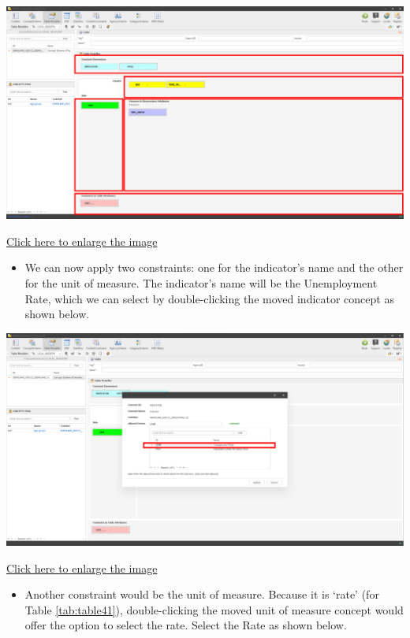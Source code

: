 \documentclass[
]{book}
\providecommand{\tightlist}{%
  \setlength{\itemsep}{0pt}\setlength{\parskip}{0pt}}
\begin{document}
\begin{center}\includegraphics[width=1\linewidth]{./images/image136} \end{center}

\href{images/image136.png}{Click here to enlarge the image}

\begin{itemize}
\tightlist
\item
  We can now apply two constraints: one for the indicator's name and the other for the unit of measure. The indicator's name will be the Unemployment Rate, which we can select by double-clicking the moved indicator concept as shown below.
\end{itemize}

\begin{center}\includegraphics[width=1\linewidth]{./images/image138} \end{center}

\href{images/image138.png}{Click here to enlarge the image}

\begin{itemize}
\tightlist
\item
  Another constraint would be the unit of measure. Because it is `rate' (for Table \ref{tab:table41}), double-clicking the moved unit of measure concept would offer the option to select the rate. Select the Rate as shown below.
\end{itemize}
\end{document}

